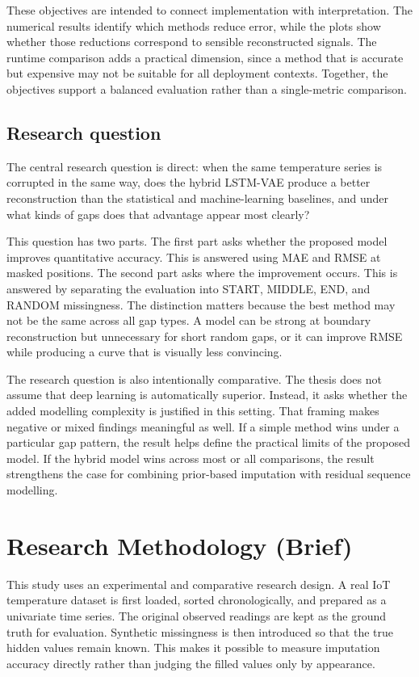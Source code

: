 These objectives are intended to connect implementation with interpretation. The numerical results identify which methods reduce error, while the plots show whether those reductions correspond to sensible reconstructed signals. The runtime comparison adds a practical dimension, since a method that is accurate but expensive may not be suitable for all deployment contexts. Together, the objectives support a balanced evaluation rather than a single-metric comparison.

\subsection{Research question}
The central research question is direct: when the same temperature series is corrupted in the same way, does the hybrid LSTM-VAE produce a better reconstruction than the statistical and machine-learning baselines, and under what kinds of gaps does that advantage appear most clearly?

This question has two parts. The first part asks whether the proposed model improves quantitative accuracy. This is answered using MAE and RMSE at masked positions. The second part asks where the improvement occurs. This is answered by separating the evaluation into START, MIDDLE, END, and RANDOM missingness. The distinction matters because the best method may not be the same across all gap types. A model can be strong at boundary reconstruction but unnecessary for short random gaps, or it can improve RMSE while producing a curve that is visually less convincing.

The research question is also intentionally comparative. The thesis does not assume that deep learning is automatically superior. Instead, it asks whether the added modelling complexity is justified in this setting. That framing makes negative or mixed findings meaningful as well. If a simple method wins under a particular gap pattern, the result helps define the practical limits of the proposed model. If the hybrid model wins across most or all comparisons, the result strengthens the case for combining prior-based imputation with residual sequence modelling.

\section{Research Methodology (Brief)}
This study uses an experimental and comparative research design. A real IoT temperature dataset is first loaded, sorted chronologically, and prepared as a univariate time series. The original observed readings are kept as the ground truth for evaluation. Synthetic missingness is then introduced so that the true hidden values remain known. This makes it possible to measure imputation accuracy directly rather than judging the filled values only by appearance.

